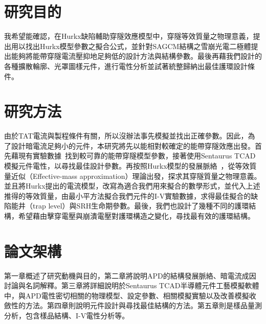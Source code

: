 \section{研究目的}
我希望能確認，在Hurkx缺陷輔助穿隧效應模型中，穿隧等效質量之物理意義，提出用以找出Hurkx模型參數之擬合公式，並針對SAGCM結構之雪崩光電二極體提出能夠將能帶穿隧電流壓抑地足夠低的設計方法與結構參數。最後再藉我們設計的各種擴散輪廓、光罩圖樣元件，進行電性分析並試著統整歸納出最佳護環設計條件。
\section{研究方法}
由於TAT電流與製程條件有關，所以沒辦法事先模擬並找出正確參數。因此，為了設計暗電流足夠小的元件，本研究將先以能相對較確定的能帶穿隧效應出發。首先藉現有實驗數據~\cite{Ando:1980fn}找到較可靠的能帶穿隧模型參數，接著使用Sentaurus TCAD模擬元件電性，以尋找最佳設計參數。再按照Hurkx模型的發展脈絡~\cite{hurkx1989modelling}，從等效質量近似（Effective-mass approximation）理論出發，探求其穿隧質量之物理意義。並且將Hurkx提出的電流模型，改寫為適合我們用來擬合的數學形式，並代入上述推得的等效質量，由最小平方法擬合我們元件的I-V實驗數據，求得最佳擬合的缺陷能井（trap level）與SRH生命期參數。最後，我們也設計了幾種不同的護環結構，希望藉由擊穿電壓與崩潰電壓對護環構造之變化，尋找最有效的護環結構。
\section{論文架構}
第一章概述了研究動機與目的，第二章將說明APD的結構發展脈絡、暗電流成因討論與名詞解釋。第三章將詳細說明於Sentaurus TCAD半導體元件工藝模擬軟體中，與APD電性密切相關的物理模型、設定參數、相關模擬實驗以及改善模擬收斂性的方法。第四章則說明元件設計與尋找最佳結構的方法。第五章則是樣品量測分析，包含樣品結構、I-V電性分析等。
